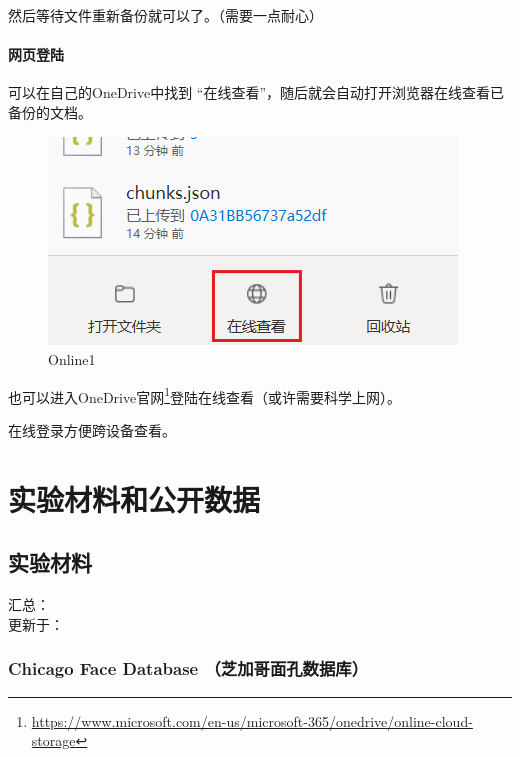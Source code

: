 \documentclass[]{ctexbook}
\renewcommand{\href}[2]{#2\footnote{\url{#1}}}
\theoremstyle{definition}
\theoremstyle{definition}
\theoremstyle{definition}
\theoremstyle{definition}
\theoremstyle{remark}
\begin{document}
然后等待文件重新备份就可以了。（需要一点耐心）

\subsection{网页登陆}\label{ux7f51ux9875ux767bux9646}

可以在自己的OneDrive中找到 ``在线查看''，随后就会自动打开浏览器在线查看已备份的文档。

\begin{figure}

{\centering \includegraphics[width=0.9\linewidth]{img/OneDrive/Online1} 

}

\caption{Online1}\label{fig:OneDrive-Online1}
\end{figure}

也可以进入\href{https://www.microsoft.com/en-us/microsoft-365/onedrive/online-cloud-storage}{OneDrive官网}登陆在线查看（或许需要科学上网）。

在线登录方便跨设备查看。

\part{实验材料和公开数据}\label{part-ux5b9eux9a8cux6750ux6599ux548cux516cux5f00ux6570ux636e}

\chapter{实验材料}\label{materials}

汇总：\\
更新于：

\section{Chicago Face Database （芝加哥面孔数据库）}\label{chicago-face-database-ux829dux52a0ux54e5ux9762ux5b54ux6570ux636eux5e93}
\end{document}
